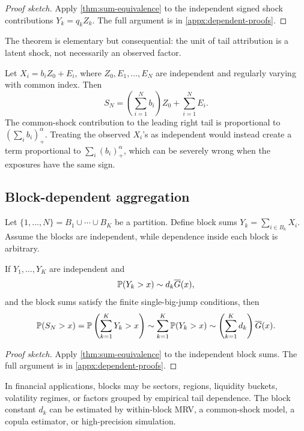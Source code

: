 \begin{proof}[Proof sketch]
Apply \cref{thm:sum-equivalence} to the independent signed shock contributions
$Y_k=q_kZ_k$. The full argument is in \cref{appx:dependent-proofs}.
\end{proof}

The theorem is elementary but consequential: the unit of tail attribution is a
latent shock, not necessarily an observed factor.

\begin{example}
\label{ex:common-shock}
Let \(X_i=b_iZ_0+E_i\), where \(Z_0,E_1,\ldots,E_N\) are independent and
regularly varying with common index. Then
\[
  S_N=\left(\sum_{i=1}^N b_i\right)Z_0+
      \sum_{i=1}^N E_i.
\]
The common-shock contribution to the leading right tail is proportional to
\((\sum_i b_i)_+^\alpha\). Treating the observed \(X_i\)'s as independent would
instead create a term proportional to \(\sum_i (b_i)_+^\alpha\), which can be
severely wrong when the exposures have the same sign.
\end{example}



\subsection{Block-dependent aggregation}

Let \(\{1,\ldots,N\}=B_1\cup\cdots\cup B_K\) be a partition. Define block sums
\(Y_k=\sum_{i\in B_k}X_i\). Assume the blocks are independent, while dependence
inside each block is arbitrary.

\begin{theorem}
\label{thm:block-reduction}
If \(Y_1,
\ldots,Y_K\) are independent and
\[\mathbb{P}(Y_k>x)\sim d_k\overline{G}(x),\]
and the block sums satisfy the finite single-big-jump conditions, then
\[
  \mathbb{P}(S_N>x)=\mathbb{P}\left(\sum_{k=1}^KY_k>x\right)
  \sim \sum_{k=1}^K\mathbb{P}(Y_k>x)
  \sim \left(\sum_{k=1}^K d_k\right)\overline{G}(x).
\]
\end{theorem}

\begin{proof}[Proof sketch]
Apply \cref{thm:sum-equivalence} to the independent block sums. The full
argument is in \cref{appx:dependent-proofs}.
\end{proof}

In financial applications, blocks may be sectors, regions, liquidity buckets,
volatility regimes, or factors grouped by empirical tail dependence. The block
constant \(d_k\) can be estimated by within-block MRV, a common-shock model, a
copula estimator, or high-precision simulation.

